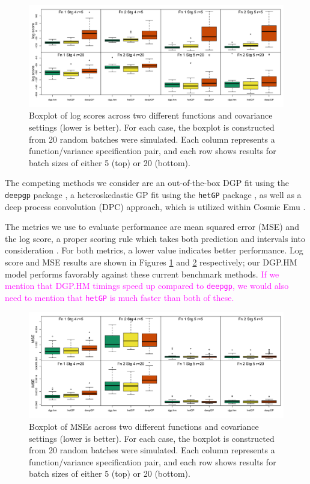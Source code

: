 \documentclass[11pt]{article}
\begin{document}
\begin{figure}[t]
    \centering
    \includegraphics[width=6in]{sims_logS.png}
    \caption{Boxplot of log scores across two different functions and covariance 
             settings (lower is better). For each case, the boxplot is constructed 
             from 20 random batches were simulated. Each column represents a function/variance 
             specification pair, and each row shows results for batch sizes of either 
             5 (top) or 20 (bottom).}
    \label{fig:sims_logS}
\end{figure}

The competing methods we consider are an out-of-the-box DGP fit using the 
\texttt{deepgp} package \citep{sauer2023active}, a heteroskedastic GP fit using 
the \texttt{hetGP} package \citep{binois2018practical, binois2021hetgp}, as well 
as a deep process convolution (DPC) approach, which is utilized within Cosmic 
Emu \citep{moran2023mira}. 

The metrics we use to evaluate performance are mean squared error (MSE) and the 
log score, a proper scoring rule which takes both prediction and intervals into 
consideration \citep{gneiting2007strictly}. For both metrics, a lower value indicates 
better performance. Log score and MSE results are shown in Figures \ref{fig:sims_logS} 
and \ref{fig:sims_MSE} respectively; our DGP.HM model performs favorably against 
these current benchmark methods. \textcolor{magenta}{If we mention that DGP.HM timings 
speed up compared to \texttt{deepgp}, we would also need to mention that \texttt{hetGP} 
is much faster than both of these.}

\begin{figure}
    \centering
    \includegraphics[width=6in]{sims_MSE.png}
    \caption{Boxplot of MSEs across two different functions and covariance settings 
             (lower is better). For each case, the boxplot is constructed from 20 
             random batches were simulated. Each column represents a function/variance 
             specification pair, and each row shows results for batch sizes of 
             either 5 (top) or 20 (bottom).}    
    \label{fig:sims_MSE}
\end{figure}
\end{document}
